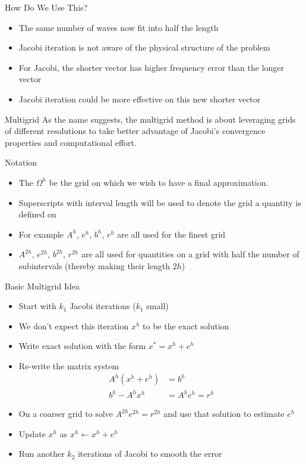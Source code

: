 \documentclass[11pt]{beamer}
\begin{document}
\begin{frame}{How Do We Use This?}
  \begin{itemize}
  \item The same number of waves now fit into half the length
  \item Jacobi iteration is not aware of the physical structure of the
    problem
  \item For Jacobi, the shorter vector has higher frequency error than the
    longer vector
  \item Jacobi iteration could be more effective on this new shorter vector
  \end{itemize}
\end{frame}
\begin{frame}{Multigrid}
  As the name suggests, the multigrid method is about leveraging grids of
  different resolutions to take better advantage of Jacobi's convergence
  properties and computational effort.
\end{frame}
\begin{frame}{Notation}
  \begin{itemize}
  \item The $\Omega^h$ be the grid on which we wish to have a final approximation.
  \item Superscripts with interval length will be used to denote the grid a
    quantity is defined on
  \item For example $A^h$, $e^h$, $b^{h}$, $r^h$ are all used for the finest grid
  \item $A^{2h}$, $e^{2h}$, $b^{2h}$, $r^{2h}$ are all used for quantities on a grid
    with half the number of subintervals (thereby making their length $2h$)
  \end{itemize}
\end{frame}
\begin{frame}{Basic Multigrid Idea}
  \begin{itemize}
  \item Start with $k_1$ Jacobi iterations ($k_1$ small)
  \item We don't expect this iteration $x^h$ to be the exact solution
  \item Write exact solution with the form $x^* = x^{h} + e^{h}$
  \item Re-write the matrix system
    \begin{align*}
      A^h(x^h + e^h) &= b^h \\
      b^h - A^hx^h &= A^he^h = r^h
    \end{align*}
  \item On a coarser grid to solve $A^{2h}e^{2h} = r^{2h}$ and use that solution
    to estimate $e^h$
  \item Update $x^{h}$ as $x^h \leftarrow x^h + e^h$
  \item Run another $k_2$ iterations of Jacobi to smooth the error
  \end{itemize}
\end{frame}
\end{document}
